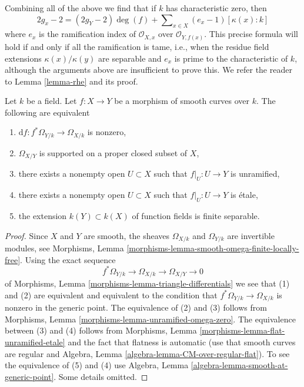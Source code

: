 \medskip\noindent
Combining all of the above we find that if $k$ has characteristic
zero, then
$$
2g_x - 2 = (2g_Y - 2)\deg(f) +
\sum\nolimits_{x \in X} (e_x - 1)[\kappa(x) : k]
$$
where $e_x$ is the ramification index of $\mathcal{O}_{X, x}$ over
$\mathcal{O}_{Y, f(x)}$. This precise formula will hold if and only
if all the ramification is tame, i.e., when the
residue field extensions $\kappa(x)/\kappa(y)$ are separable and
$e_x$ is prime to the characteristic of $k$, although the
arguments above are insufficient to prove this. We refer the reader
to Lemma \ref{lemma-rhe} and its proof.

\begin{lemma}
\label{lemma-generically-etale}
Let $k$ be a field. Let $f : X \to Y$ be a morphism of smooth curves over $k$.
The following are equivalent
\begin{enumerate}
\item $\text{d}f : f^*\Omega_{Y/k} \to \Omega_{X/k}$ is nonzero,
\item $\Omega_{X/Y}$ is supported on a proper closed subset of $X$,
\item there exists a nonempty open $U \subset X$ such that
$f|_U : U \to Y$ is unramified,
\item there exists a nonempty open $U \subset X$ such that
$f|_U : U \to Y$ is \'etale,
\item the extension $k(Y) \subset k(X)$ of function fields is
finite separable.
\end{enumerate}
\end{lemma}

\begin{proof}
Since $X$ and $Y$ are smooth, the sheaves $\Omega_{X/k}$ and
$\Omega_{Y/k}$ are invertible modules, see
Morphisms, Lemma \ref{morphisms-lemma-smooth-omega-finite-locally-free}.
Using the exact sequence
$$
f^*\Omega_{Y/k} \longrightarrow \Omega_{X/k}
\longrightarrow \Omega_{X/Y} \longrightarrow 0
$$
of Morphisms, Lemma \ref{morphisms-lemma-triangle-differentials}
we see that (1) and (2) are equivalent and equivalent to the
condition that $f^*\Omega_{Y/k} \to \Omega_{X/k}$ is nonzero
in the generic point. The equivalence of (2) and (3) follows
from Morphisms, Lemma \ref{morphisms-lemma-unramified-omega-zero}.
The equivalence between (3) and (4) follows from
Morphisms, Lemma \ref{morphisms-lemma-flat-unramified-etale}
and the fact that flatness is automatic
(use that smooth curves are regular and
Algebra, Lemma \ref{algebra-lemma-CM-over-regular-flat}).
To see the equivalence of (5) and (4)
use Algebra, Lemma \ref{algebra-lemma-smooth-at-generic-point}.
Some details omitted.
\end{proof}

